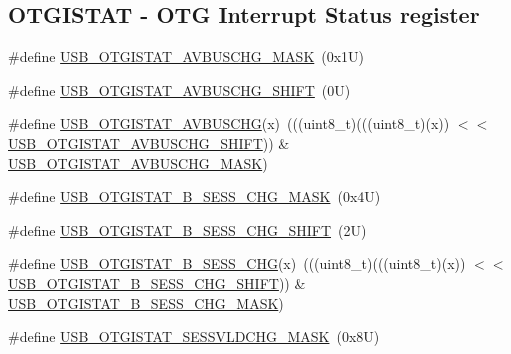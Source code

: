 \subsection*{O\+T\+G\+I\+S\+T\+AT -\/ O\+TG Interrupt Status register}
\begin{DoxyCompactItemize}
\item 
\#define \mbox{\hyperlink{group___u_s_b___register___masks_ga4aed6ee50bdd46063aa551dfb6e91d80}{U\+S\+B\+\_\+\+O\+T\+G\+I\+S\+T\+A\+T\+\_\+\+A\+V\+B\+U\+S\+C\+H\+G\+\_\+\+M\+A\+SK}}~(0x1\+U)
\item 
\#define \mbox{\hyperlink{group___u_s_b___register___masks_ga0b762b08ffd3b747e2d0ad17b5f1641a}{U\+S\+B\+\_\+\+O\+T\+G\+I\+S\+T\+A\+T\+\_\+\+A\+V\+B\+U\+S\+C\+H\+G\+\_\+\+S\+H\+I\+FT}}~(0\+U)
\item 
\#define \mbox{\hyperlink{group___u_s_b___register___masks_gaa68e12c05c120ef3e502fc51c84e0786}{U\+S\+B\+\_\+\+O\+T\+G\+I\+S\+T\+A\+T\+\_\+\+A\+V\+B\+U\+S\+C\+HG}}(x)~(((uint8\+\_\+t)(((uint8\+\_\+t)(x)) $<$$<$ \mbox{\hyperlink{group___u_s_b___register___masks_ga0b762b08ffd3b747e2d0ad17b5f1641a}{U\+S\+B\+\_\+\+O\+T\+G\+I\+S\+T\+A\+T\+\_\+\+A\+V\+B\+U\+S\+C\+H\+G\+\_\+\+S\+H\+I\+FT}})) \& \mbox{\hyperlink{group___u_s_b___register___masks_ga4aed6ee50bdd46063aa551dfb6e91d80}{U\+S\+B\+\_\+\+O\+T\+G\+I\+S\+T\+A\+T\+\_\+\+A\+V\+B\+U\+S\+C\+H\+G\+\_\+\+M\+A\+SK}})
\item 
\#define \mbox{\hyperlink{group___u_s_b___register___masks_gafa204dddd4f034a5085b4599642689d7}{U\+S\+B\+\_\+\+O\+T\+G\+I\+S\+T\+A\+T\+\_\+\+B\+\_\+\+S\+E\+S\+S\+\_\+\+C\+H\+G\+\_\+\+M\+A\+SK}}~(0x4\+U)
\item 
\#define \mbox{\hyperlink{group___u_s_b___register___masks_gad18c5869e529e7edbe3251ee5e3ff33f}{U\+S\+B\+\_\+\+O\+T\+G\+I\+S\+T\+A\+T\+\_\+\+B\+\_\+\+S\+E\+S\+S\+\_\+\+C\+H\+G\+\_\+\+S\+H\+I\+FT}}~(2\+U)
\item 
\#define \mbox{\hyperlink{group___u_s_b___register___masks_ga4108e08daceff6d9a326c385544b42ba}{U\+S\+B\+\_\+\+O\+T\+G\+I\+S\+T\+A\+T\+\_\+\+B\+\_\+\+S\+E\+S\+S\+\_\+\+C\+HG}}(x)~(((uint8\+\_\+t)(((uint8\+\_\+t)(x)) $<$$<$ \mbox{\hyperlink{group___u_s_b___register___masks_gad18c5869e529e7edbe3251ee5e3ff33f}{U\+S\+B\+\_\+\+O\+T\+G\+I\+S\+T\+A\+T\+\_\+\+B\+\_\+\+S\+E\+S\+S\+\_\+\+C\+H\+G\+\_\+\+S\+H\+I\+FT}})) \& \mbox{\hyperlink{group___u_s_b___register___masks_gafa204dddd4f034a5085b4599642689d7}{U\+S\+B\+\_\+\+O\+T\+G\+I\+S\+T\+A\+T\+\_\+\+B\+\_\+\+S\+E\+S\+S\+\_\+\+C\+H\+G\+\_\+\+M\+A\+SK}})
\item 
\#define \mbox{\hyperlink{group___u_s_b___register___masks_ga859962123dc28f346bafc99263efb811}{U\+S\+B\+\_\+\+O\+T\+G\+I\+S\+T\+A\+T\+\_\+\+S\+E\+S\+S\+V\+L\+D\+C\+H\+G\+\_\+\+M\+A\+SK}}~(0x8\+U)

\end{DoxyCompactItemize}
